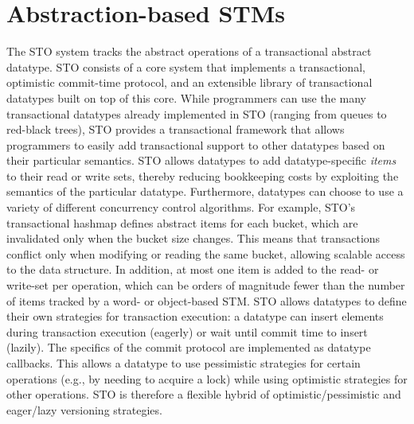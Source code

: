 \section{Abstraction-based STMs}

The STO system tracks the abstract operations of a transactional abstract datatype. STO consists of a core system that implements a transactional, optimistic commit-time protocol, and an extensible library of transactional datatypes built on top of this core. While programmers can use the many transactional datatypes already implemented in STO (ranging from queues to red-black trees), STO provides a transactional framework that allows programmers to easily add transactional support to other datatypes based on their particular semantics. STO allows datatypes to add datatype-specific \emph{items} to their read or write sets, thereby reducing bookkeeping costs by 
exploiting the semantics of the particular datatype. Furthermore, datatypes can choose to use a variety of different concurrency control algorithms. For example, STO's transactional hashmap defines abstract items for each bucket, which are invalidated only when the bucket size changes. This means that transactions conflict only when modifying or reading the same bucket, allowing scalable access to the data structure. In addition, at most one item is added to the read- or write-set per operation, which can be orders of magnitude fewer than the number of items tracked by a word- or object-based STM. STO allows datatypes to define their own strategies for transaction execution: a datatype can insert elements during transaction execution (eagerly) or wait until commit time to insert (lazily). The specifics of the commit protocol are implemented as datatype callbacks. This allows a datatype to use pessimistic strategies for certain operations (e.g., by needing to acquire a lock) while using optimistic strategies for other operations. STO is therefore a flexible hybrid of optimistic/pessimistic and eager/lazy versioning strategies.


